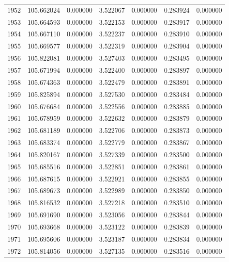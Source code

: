 \begin{tabular}{rrrrrrr}
1952 & 105.662024 &    0.000000 &  3.522067 &    0.000000 &    0.283924 &  0.000000 \\
1953 & 105.664593 &    0.000000 &  3.522153 &    0.000000 &    0.283917 &  0.000000 \\
1954 & 105.667110 &    0.000000 &  3.522237 &    0.000000 &    0.283910 &  0.000000 \\
1955 & 105.669577 &    0.000000 &  3.522319 &    0.000000 &    0.283904 &  0.000000 \\
1956 & 105.822081 &    0.000000 &  3.527403 &    0.000000 &    0.283495 &  0.000000 \\
1957 & 105.671994 &    0.000000 &  3.522400 &    0.000000 &    0.283897 &  0.000000 \\
1958 & 105.674363 &    0.000000 &  3.522479 &    0.000000 &    0.283891 &  0.000000 \\
1959 & 105.825894 &    0.000000 &  3.527530 &    0.000000 &    0.283484 &  0.000000 \\
1960 & 105.676684 &    0.000000 &  3.522556 &    0.000000 &    0.283885 &  0.000000 \\
1961 & 105.678959 &    0.000000 &  3.522632 &    0.000000 &    0.283879 &  0.000000 \\
1962 & 105.681189 &    0.000000 &  3.522706 &    0.000000 &    0.283873 &  0.000000 \\
1963 & 105.683374 &    0.000000 &  3.522779 &    0.000000 &    0.283867 &  0.000000 \\
1964 & 105.820167 &    0.000000 &  3.527339 &    0.000000 &    0.283500 &  0.000000 \\
1965 & 105.685516 &    0.000000 &  3.522851 &    0.000000 &    0.283861 &  0.000000 \\
1966 & 105.687615 &    0.000000 &  3.522921 &    0.000000 &    0.283855 &  0.000000 \\
1967 & 105.689673 &    0.000000 &  3.522989 &    0.000000 &    0.283850 &  0.000000 \\
1968 & 105.816532 &    0.000000 &  3.527218 &    0.000000 &    0.283510 &  0.000000 \\
1969 & 105.691690 &    0.000000 &  3.523056 &    0.000000 &    0.283844 &  0.000000 \\
1970 & 105.693668 &    0.000000 &  3.523122 &    0.000000 &    0.283839 &  0.000000 \\
1971 & 105.695606 &    0.000000 &  3.523187 &    0.000000 &    0.283834 &  0.000000 \\
1972 & 105.814056 &    0.000000 &  3.527135 &    0.000000 &    0.283516 &  0.000000 \\

\end{tabular}
